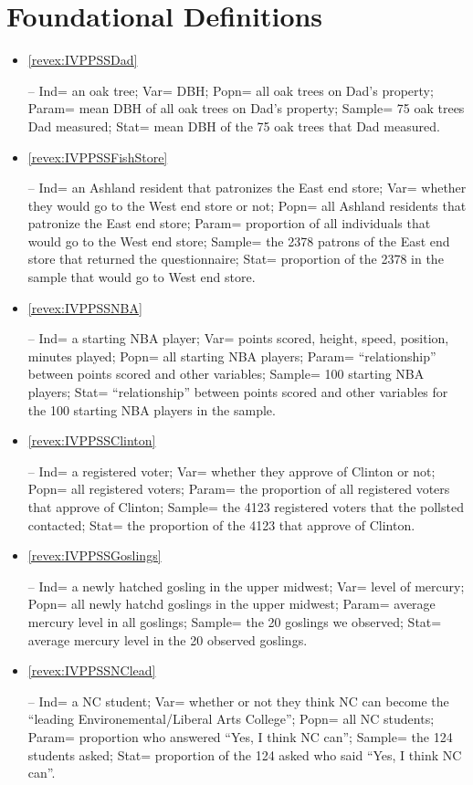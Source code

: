 \documentclass[10pt,openany]{book}\usepackage[]{graphicx}\usepackage[]{color}
\begin{document}
\section*{Foundational Definitions}
\begin{itemize}
  \item \hypertarget{ans:IVPPSSDad}{\ref{revex:IVPPSSDad}} -- Ind= an oak tree; Var= DBH; Popn= all oak trees on Dad's property; Param= mean DBH of all oak trees on Dad's property; Sample= 75 oak trees Dad measured; Stat= mean DBH of the 75 oak trees that Dad measured.

  \item \hypertarget{ans:IVPPSSFishStore}{\ref{revex:IVPPSSFishStore}} -- Ind= an Ashland resident that patronizes the East end store; Var= whether they would go to the West end store or not; Popn= all Ashland residents that patronize the East end store; Param= proportion of all individuals that would go to the West end store; Sample= the 2378 patrons of the East end store that returned the questionnaire; Stat= proportion of the 2378 in the sample that would go to West end store.

  \item \hypertarget{ans:IVPPSSNBA}{\ref{revex:IVPPSSNBA}} -- Ind= a starting NBA player; Var= points scored, height, speed, position, minutes played; Popn= all starting NBA players; Param= ``relationship'' between points scored and other variables; Sample= 100 starting NBA players; Stat= ``relationship'' between points scored and other variables for the 100 starting NBA players in the sample.

  \item \hypertarget{ans:IVPPSSClinton}{\ref{revex:IVPPSSClinton}} -- Ind= a registered voter; Var= whether they approve of Clinton or not; Popn= all registered voters; Param= the proportion of all registered voters that approve of Clinton; Sample= the 4123 registered voters that the pollsted contacted; Stat= the proportion of the 4123 that approve of Clinton.

  \item \hypertarget{ans:IVPPSSGoslings}{\ref{revex:IVPPSSGoslings}} -- Ind= a newly hatched gosling in the upper midwest; Var= level of mercury; Popn= all newly hatchd goslings in the upper midwest; Param= average mercury level in all goslings; Sample= the 20 goslings we observed; Stat= average mercury level in the 20 observed goslings.

  \item \hypertarget{ans:IVPPSSNClead}{\ref{revex:IVPPSSNClead}} -- Ind= a NC student; Var= whether or not they think NC can become the ``leading Environemental/Liberal Arts College''; Popn= all NC students; Param= proportion who answered ``Yes, I think NC can''; Sample= the 124 students asked; Stat= proportion of the 124 asked who said ``Yes, I think NC can''.


\end{itemize}
\end{document}
